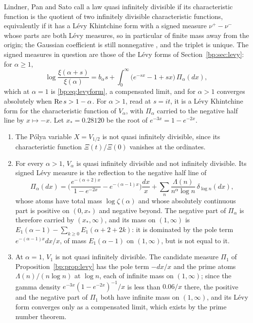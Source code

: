 Lindner, Pan and Sato \cite{LPS18} call a law quasi infinitely divisible if its characteristic function is the quotient of two infinitely divisible characteristic functions, equivalently if it has a L\'evy Khintchine form with a signed measure $\nu^+-\nu^-$ whose parts are both L\'evy measures, so in particular of finite mass away from the origin; the Gaussian coefficient is still nonnegative \cite[Lemma 2.7]{LPS18}, and the triplet is unique. The signed measures in question are those of the L\'evy forms of Section~\ref{bp:sec:levy}: for $\alpha\ge1$,
\[
\log\frac{\xi(\alpha+s)}{\xi(\alpha)}=b_\alpha s+\int_0^\infty\big(e^{-sx}-1+sx\big)\,\Pi_\alpha(dx),
\]
which at $\alpha=1$ is \eqref{bp:eq:levyform}, a compensated limit, and for $\alpha>1$ converges absolutely when $\operatorname{Re} s>1-\alpha$. For $\alpha>1$, read at $s=it$, it is a L\'evy Khintchine form for the characteristic function of $V_\alpha$, with $\Pi_\alpha$ carried to the negative half line by $x\mapsto-x$. Let $x_*=0.28120$ be the root of $e^{-3x}=1-e^{-2x}$.

\begin{proposition}\label{sb:prop:qid}
\begin{enumerate}
\item The P\'olya variable $X=V_{1/2}$ is not quasi infinitely divisible, since its characteristic function $\Xi(t)/\Xi(0)$ vanishes at the ordinates.
\item For every $\alpha>1$, $V_\alpha$ is quasi infinitely divisible and not infinitely divisible. Its signed L\'evy measure is the reflection to the negative half line of
\[
\Pi_\alpha(dx)=\Big(\frac{e^{-(\alpha+2)x}}{1-e^{-2x}}-e^{-(\alpha-1)x}\Big)\frac{dx}x+\sum_n\frac{\Lambda(n)}{n^\alpha\log n}\,\delta_{\log n}(dx),
\]
whose atoms have total mass $\log\zeta(\alpha)$ and whose absolutely continuous part is positive on $(0,x_*)$ and negative beyond. The negative part of $\Pi_\alpha$ is therefore carried by $(x_*,\infty)$, and its mass on $(1,\infty)$ is $E_1(\alpha-1)-\sum_{k\ge0}E_1(\alpha+2+2k)$: it is dominated by the pole term $e^{-(\alpha-1)x}dx/x$, of mass $E_1(\alpha-1)$ on $(1,\infty)$, but is not equal to it.
\item At $\alpha=1$, $V_1$ is not quasi infinitely divisible. The candidate measure $\Pi_1$ of Proposition~\ref{bp:prop:levy} has the pole term $-dx/x$ and the prime atoms $\Lambda(n)/(n\log n)$ at $\log n$, each of infinite mass on $(1,\infty)$; since the gamma density $e^{-3x}(1-e^{-2x})^{-1}/x$ is less than $0.06/x$ there, the positive and the negative part of $\Pi_1$ both have infinite mass on $(1,\infty)$, and its L\'evy form converges only as a compensated limit, which exists by the prime number theorem.
\end{enumerate}
\end{proposition}

